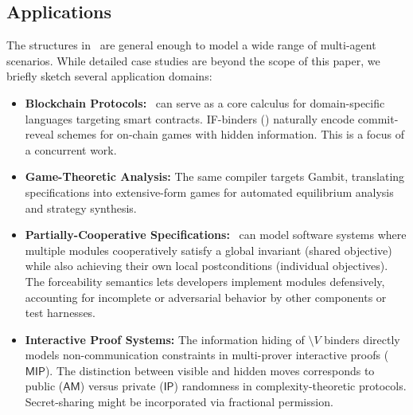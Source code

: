 \subsection{Applications}
The structures in \KFOL\ are general enough to model a wide range of 
multi-agent scenarios.
While detailed case studies are beyond the scope of 
this paper, we briefly sketch several application domains:
\begin{itemize}
    \item \textbf{Blockchain Protocols:} \KFOL\ can serve as a core calculus 
      for domain-specific languages targeting smart contracts.
 IF-binders 
      () naturally encode commit-reveal schemes for 
      on-chain games with hidden information.
 This is a focus of a concurrent work.
          
    \item \textbf{Game-Theoretic Analysis:} The same compiler targets Gambit, 
          translating specifications into extensive-form games for automated 
          equilibrium analysis and strategy synthesis.
 \item \textbf{Partially-Cooperative Specifications:} \KFOL\ can model 
          software systems where multiple modules cooperatively satisfy a 
          global invariant (shared objective) while also achieving their own 
          local postconditions (individual objectives).
 The forceability 
          semantics lets developers implement modules defensively, accounting 
          for incomplete or adversarial behavior by other components or test 
          harnesses.
 \item \textbf{Interactive Proof Systems:} The information hiding of 
          $\setminus V$ binders directly models non-communication constraints 
          in multi-prover interactive proofs ($\mathsf{MIP}$).
 The distinction 
          between visible and hidden moves corresponds to public 
          ($\mathsf{AM}$) versus private ($\mathsf{IP}$) randomness in 
          complexity-theoretic protocols. Secret-sharing might be incorporated via fractional permission.
\end{itemize}
